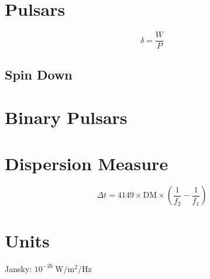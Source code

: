     
    \section{Pulsars}
    \begin{equation}
        \delta = \frac{W}{P}
    \end{equation}
    \subsection{Spin Down}

    \section{Binary Pulsars}

    \section{Dispersion Measure}
    \begin{equation}
        \Delta t = 4149 \times \text{DM} \times \left( \frac{1}{f_2} - \frac{1}{f_1}\right)
    \end{equation}

    \section{Units}

    Jansky: \hfill $10^{-26} \ \text{W}/\text{m}^2/\text{Hz}$ 